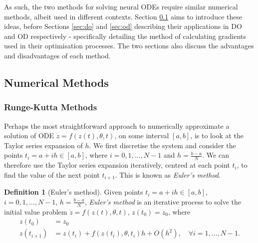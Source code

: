 \documentclass[a4paper,11pt,titlepage]{article}
\theoremstyle{definition}
\newtheorem{definition}{Definition}[section]
\theoremstyle{plain}
\theoremstyle{remark}
\begin{document}
As such, the two methods for solving neural ODEs require similar numerical methods, albeit used in different contexts. Section \ref{sec:nummethods} aims to introduce these ideas, before Sections \ref{sec:do} and \ref{sec:od} describing their applications in DO and OD respectively - specifically detailing the method of calculating gradients used in their optimisation processes. The two sections also discuss the advantages and disadvantages of each method.

\subsection{Numerical Methods}
\label{sec:nummethods}

\subsubsection{Runge-Kutta Methods}
\label{sec:rungekutta}

Perhaps the most straightforward approach to numerically approximate a solution of ODE $\dot{z}= f(z(t), \theta,t)$, on some interval $\left[a, b\right]$, is to look at the Taylor series expansion of $h$. We first discretise the system and consider the points $t_i = a + ih \in \left[a, b\right]$, where $i = 0, 1, \dots, N - 1$ and $h = \frac{b-a}{N}$. We can therefore use the Taylor series expansion iteratively, centred at each point $t_i$, to find the value of the next point $t_{i + 1}$. This is known as \textit{Euler's method}.

\begin{definition}[Euler's method]
    Given points $t_i = a + ih \in \left[a, b\right]$, $i = 0, 1, \dots, N - 1$, $h = \frac{b-a}{N}$, \textit{Euler's method} is an iterative process to solve the initial value problem $\dot{z}= f(z(t), \theta,t)$, $z(t_0) = z_0$, where
    \begin{align*}
        z(t_0) &= z_0 \\
        z(t_{i+1}) &= z(t_i) + f(z(t_{i}), \theta, t_i)h + O(h^2),\quad\forall i = 1, \dots, N - 1.
    \end{align*}
\end{definition}
\end{document}
